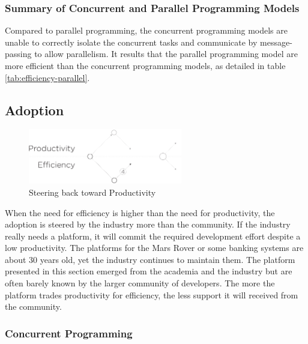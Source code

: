 \subsubsection{Summary of Concurrent and Parallel Programming Models}

Compared to parallel programming, the concurrent programming models are unable to correctly isolate the concurrent tasks and communicate by message-passing to allow parallelism.
It results that the parallel programming model are more efficient than the concurrent programming models, as detailed in table \ref{tab:efficiency-parallel}.


\subsection{Adoption} \label{chapter3:software-efficiency:adoption}

\begin{figure}[!h]
\begin{center}
\includegraphics[width=0.6\textwidth]{../resources/state-of-the-art-4.pdf}
\end{center}
\caption{Steering back toward Productivity}
\label{fig:state-of-the-art-4}
\end{figure}

When the need for efficiency is higher than the need for productivity, the adoption is steered by the industry more than the community.
If the industry really needs a platform, it will commit the required development effort despite a low productivity.
The platforms for the Mars Rover or some banking systems are about 30 years old, yet the industry continues to maintain them.
The platform presented in this section emerged from the academia and the industry but are often barely known by the larger community of developers.
The more the platform trades productivity for efficiency, the less support it will received from the community.

\subsubsection{Concurrent Programming}

